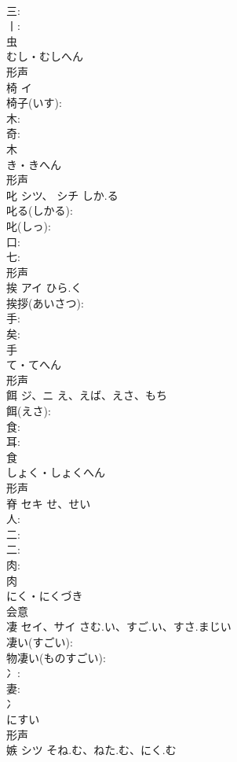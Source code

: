 \documentclass[8pt]{extreport}
\begin{document}
\begin{CJK}{UTF8}{min}
\\	三: 
\\	丨: 
\\	虫	
\\	むし・むしへん	
\\	形声 
\\	椅	イ			
\\	椅子(いす): 
\\	木: 
\\	奇: 
\\	木	
\\	き・きへん	
\\	形声 
\\	叱	シツ、 シチ	しか.る		
\\	叱る(しかる): 
\\	叱(しっ): 
\\	口: 
\\	七: 
\\	形声 
\\	挨	アイ	ひら.く		
\\	挨拶(あいさつ): 
\\	手: 
\\	矣: 
\\	手	
\\	て・てへん	
\\	形声 
\\	餌	ジ、ニ	え、えば、えさ、もち		
\\	餌(えさ): 
\\	食: 
\\	耳: 
\\	食	
\\	しょく・しょくへん	
\\	形声 
\\	脊	セキ	せ、せい		
\\	人: 
\\	二: 
\\	二: 
\\	肉: 
\\	肉	
\\	にく・にくづき	
\\	会意 
\\	凄	セイ、サイ	さむ.い、すご.い、すさ.まじい		
\\	凄い(すごい): 
\\	物凄い(ものすごい): 
\\	冫: 
\\	妻: 
\\	冫	
\\	にすい	
\\	形声 
\\	嫉	シツ	そね.む、ねた.む、にく.む		

\end{CJK}
\end{document}
